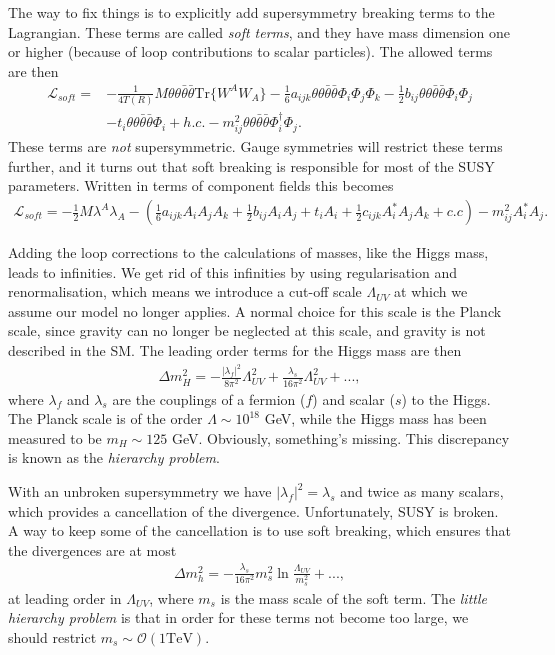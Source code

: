\documentclass[twoside,english]{uiofysmaster}
\begin{document}
The way to fix things is to explicitly add supersymmetry breaking terms to the Lagrangian. These terms are called \textit{soft terms}, and they have mass dimension one or higher (because of loop contributions to scalar particles). The allowed terms are then 
\begin{align*}
\mathcal{L}_{soft} =& - \frac{1}{4 T(R)} M \theta \theta \bar{\theta} \bar{\theta} \text{Tr} \{ W^AW_A \} - \frac{1}{6} a_{ijk} \theta \theta \bar{\theta} \bar{\theta} \Phi_i \Phi_j \Phi_k - \frac{1}{2} b_{ij} \theta \theta \bar{\theta} \bar{\theta} \Phi_i \Phi_j \\
&- t_i \theta \theta \bar{\theta} \bar{\theta} \Phi_i + h.c. - m_{ij}^2 \theta \theta \bar{\theta} \bar{\theta} \Phi_i^{\dagger} \Phi_j.
\end{align*} 
These terms are \textit{not} supersymmetric. Gauge symmetries will restrict these terms further, and it turns out that soft breaking is responsible for most of the SUSY parameters. Written in terms of component fields this becomes
\begin{align}
\mathcal{L}_{soft} = - \frac{1}{2}M \lambda^A \lambda_A - (\frac{1}{6} a_{ijk} A_i A_j A_k + \frac{1}{2} b_{ij} A_i A_j + t_i A_i + \frac{1}{2} c_{ijk} A_i^* A_j A_k + c.c) - m^2_{ij} A_i^* A_j. 
\end{align}

Adding the loop corrections to the calculations of masses, like the Higgs mass, leads to infinities. We get rid of this infinities by using regularisation and renormalisation, which means we introduce a cut-off scale $\Lambda_{UV}$ at which we assume our model no longer applies. A normal choice for this scale is the Planck scale, since gravity can no longer be neglected at this scale, and gravity is not described in the SM. The leading order terms for the Higgs mass are then
\begin{align}
\Delta m_H^2 = - \frac{|\lambda_f|^2}{8\pi^2} \Lambda_{UV}^2 + \frac{\lambda_s}{16\pi^2} \Lambda_{UV}^2 +...,
\end{align}
where $\lambda_f$ and $\lambda_s$ are the couplings of a fermion ($f$) and scalar ($s$) to the Higgs. The Planck scale is of the order $\Lambda \sim 10^{18}$ GeV, while the Higgs mass has been measured to be $m_H \sim 125$ GeV. Obviously, something's missing. This discrepancy is known as the \textit{hierarchy problem}.

With an unbroken supersymmetry we have $|\lambda_f|^2=\lambda_s$ and twice as many scalars, which provides a cancellation of the divergence. Unfortunately, SUSY is broken. A way to keep some of the cancellation is to use soft breaking, which ensures that the divergences are at most
\begin{align}
\Delta m_h^2 = - \frac{\lambda_s}{16 \pi^2} m_s^2 \ln \frac{\Lambda_{UV}}{m_s^2} +...,
\end{align}
at leading order in $\Lambda_{UV}$, where $m_s$ is the mass scale of the soft term. The \textit{little hierarchy problem} is that in order for these terms not become too large, we should restrict $m_s \sim \mathcal{O}(1 \text{TeV})$.
\end{document}
